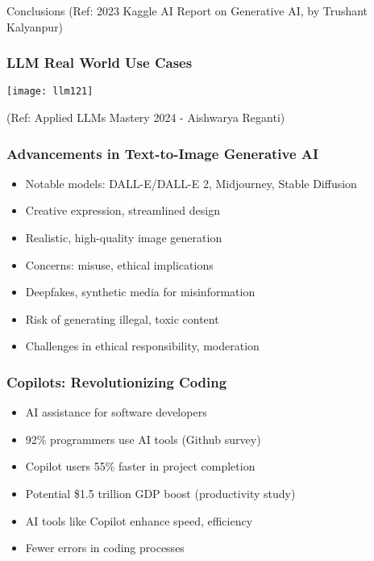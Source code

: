 \begin{frame}[fragile]\frametitle{}
\begin{center}
{\Large Conclusions }
{\tiny (Ref: 2023 Kaggle AI Report on Generative AI, by Trushant Kalyanpur)}

\end{center}


\end{frame}

\begin{frame}[fragile]\frametitle{LLM Real World Use Cases}

\begin{center}
\texttt{[image: llm121]}
\end{center}				

{\tiny (Ref: Applied LLMs Mastery 2024 - Aishwarya Reganti)}

\end{frame}


\begin{frame}[fragile]\frametitle{Advancements in Text-to-Image Generative AI}
    \begin{itemize}
        \item Notable models: DALL-E/DALL-E 2, Midjourney, Stable Diffusion
        \item Creative expression, streamlined design
        \item Realistic, high-quality image generation
        \item Concerns: misuse, ethical implications
        \item Deepfakes, synthetic media for misinformation
        \item Risk of generating illegal, toxic content
        \item Challenges in ethical responsibility, moderation
    \end{itemize}
\end{frame}

\begin{frame}[fragile]\frametitle{Copilots: Revolutionizing Coding}
    \begin{itemize}
        \item AI assistance for software developers
        \item 92\% programmers use AI tools (Github survey)
        \item Copilot users 55\% faster in project completion
        \item Potential \$1.5 trillion GDP boost (productivity study)
        \item AI tools like Copilot enhance speed, efficiency
        \item Fewer errors in coding processes
    \end{itemize}
\end{frame}

